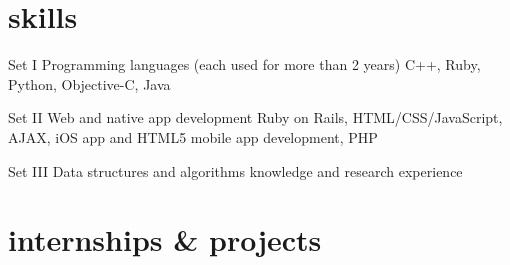\documentclass[__VERSION__]{friggeri-cv} %
\begin{document}

\section{skills}

\begin{entrylist}
  \entry
  {Set I}
  {Programming languages (each used for more than 2 years)}
  {}
  {C++, Ruby, Python, Objective-C, Java}

  \entry
  {Set II}
  {Web and native app development}
  {}
  {Ruby on Rails, HTML/CSS/JavaScript, AJAX, iOS app and HTML5 mobile app development, PHP}

  \sentry
  {Set III}
  {Data structures and algorithms knowledge and research experience}
  {}
\end{entrylist}


\section{internships \& projects}
\end{document}
